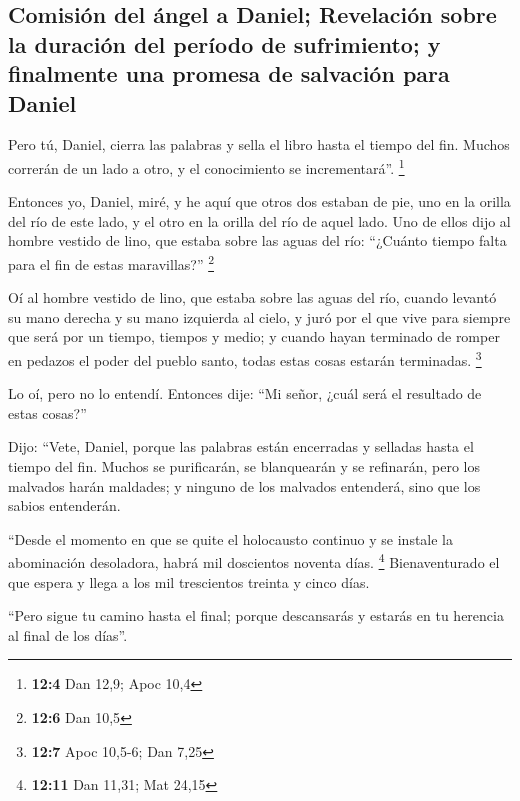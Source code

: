 \hypertarget{comisiuxf3n-del-uxe1ngel-a-daniel-revelaciuxf3n-sobre-la-duraciuxf3n-del-peruxedodo-de-sufrimiento-y-finalmente-una-promesa-de-salvaciuxf3n-para-daniel}{%
\subsection{Comisión del ángel a Daniel; Revelación sobre la duración
del período de sufrimiento; y finalmente una promesa de salvación para
Daniel}\label{comisiuxf3n-del-uxe1ngel-a-daniel-revelaciuxf3n-sobre-la-duraciuxf3n-del-peruxedodo-de-sufrimiento-y-finalmente-una-promesa-de-salvaciuxf3n-para-daniel}}

 Pero tú, Daniel, cierra las palabras y sella el libro
hasta el tiempo del fin. Muchos correrán de un lado a otro, y el
conocimiento se incrementará''. \footnote{\textbf{12:4} Dan 12,9; Apoc
  10,4}

 Entonces yo, Daniel, miré, y he aquí que otros dos
estaban de pie, uno en la orilla del río de este lado, y el otro en la
orilla del río de aquel lado.  Uno de ellos dijo al hombre
vestido de lino, que estaba sobre las aguas del río: ``¿Cuánto tiempo
falta para el fin de estas maravillas?'' \footnote{\textbf{12:6} Dan
  10,5}

 Oí al hombre vestido de lino, que estaba sobre las aguas
del río, cuando levantó su mano derecha y su mano izquierda al cielo, y
juró por el que vive para siempre que será por un tiempo, tiempos y
medio; y cuando hayan terminado de romper en pedazos el poder del pueblo
santo, todas estas cosas estarán terminadas. \footnote{\textbf{12:7}
  Apoc 10,5-6; Dan 7,25}

 Lo oí, pero no lo entendí. Entonces dije: ``Mi señor,
¿cuál será el resultado de estas cosas?''

 Dijo: ``Vete, Daniel, porque las palabras están
encerradas y selladas hasta el tiempo del fin.  Muchos se
purificarán, se blanquearán y se refinarán, pero los malvados harán
maldades; y ninguno de los malvados entenderá, sino que los sabios
entenderán.

 ``Desde el momento en que se quite el holocausto
continuo y se instale la abominación desoladora, habrá mil doscientos
noventa días. \footnote{\textbf{12:11} Dan 11,31; Mat 24,15}
 Bienaventurado el que espera y llega a los mil
trescientos treinta y cinco días.

 ``Pero sigue tu camino hasta el final; porque
descansarás y estarás en tu herencia al final de los días''.
